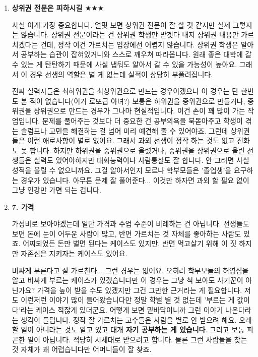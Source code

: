 \begin{enumerate}
    \item \textbf{상위권 전문은 피하시길 $\bigstar$$\bigstar$$\bigstar$}
    \vspace{5mm}

    사실 이게 가장 중요합니다. 얼핏 보면 상위권 전문이 잘 할 것 같지만 실제 그렇지는 않습니다.
    상위권 전문이라는 건 상위권 학생만 받겟다 내지 상위권 내용만 가르치겠다는 건데, 정작 이건 가르치는 입장에선 어렵지 않습니다.
    상위권 학생은 알아서 공부하는 습관이 잡혀있거니와 스스로 깨우쳐 따라옵니다.
    원래 좋은 대학에 갈 수 있는 게 탄탄하기 때문에 사실 냅둬도 알아서 갈 수 있을 가능성이 높아요.
    그래서 이 경우 선생의 역할은 별 게 없는데 실적이 상당히 부풀려집니다.
    \vspace{5mm}

    진짜 실력자들은 최하위권을 최상위권으로 만드는 경우이겠으나 이 경우는 단 한번도 본 적이 없습니다(이거 로또급 아녀?)
    보통은 하위권을 중위권으로 만들거나, 중위권을 상위권으로 만드는 경우가 그나마 현실적입니다. 이건 손이 꽤 많이 가는 작업입니다.
    문제를 풀어주는 것보다 더 중요한 건 공부의욕을 북돋아주고 학생이 겪는 슬럼프나 고민을 해결하는 걸 넘어 미리 예견해 줄 수 있어야죠.
    그런데 상위권들은 이런 애로사항이 별로 없어요. 그래서 과외 선생이 정작 하는 것도 없고 진화도 못 합니다.
    하지만 하위권을 중위권으로 올렸거나, 중위권을 상위권으로 올린 선생들은 실력도 있어야하지만 대화능력이나  사람통찰도 잘 합니다.
    안 그러면 사실 성적을 올릴 수 없으니까요. 그걸 알아서인지 모르나 학부모들은 '졸업생'을 요구하는 경우가 있습니다.
    아무튼 문제 잘 풀어준다... 이것만 하자면 과외 할 필요 없이 그냥 인강만 가면 되는 겁니다.
    \vspace{5mm}

    \item \textbf{7. 가격}
    \vspace{5mm}

    가성비로 보아야겠는데 일단 가격과 수업 수준이 비례하는 건 아닙니다.
    선생들도 보면 돈에 눈이 어두운 사람이 많고, 반면 가르치는 것 자체를 좋아하는 사람도 있죠.
    어찌되었든 돈만 벌면 된다는 케이스도 있지만, 반면 먹고살기 위해 이 짓 하지만 자존심은 지키자는 케이스도 있어요.
    \vspace{5mm}

    비싸게 부른다고 잘 가르친다... 그런 경우는 없어요. 오히려 학부모들의 허영심을 알고 비싸게 부르는 케이스가 있겠습니다만
    이 경우는 그냥 척 보아도 사기꾼이 아닌가요?  가격을 높이 받을 수도 있겠지만 그건 그만한 근거라는 게 필요합니다.
    저도 이런저런 이야기 많이 들어왔습니다만 정말 학벌 별 것 없는데 '부르는 게 값이다'라는 케이스 적잖게 있더군요.
    어떻게 보면 밑바닥이니까 그런 이야기 나온다라는 생각이 들덥니다.
    정작 잘 가르치는 고수들은 사람을 별로 안 받으려 해요. 오래 할 일이 아니라는 것도 알고 있고 대개 \textbf{자기 공부하는 게 있습니다}.
    그리고 보통 피곤한 일이 아닙니다. 적당히 시세대로 받으려고 합니다.
    물론 그런 사람들을 찾는 것 자체가 꽤 어렵습니다만 어머니들이 잘 찾죠.
    \vspace{5mm}

\end{enumerate}

